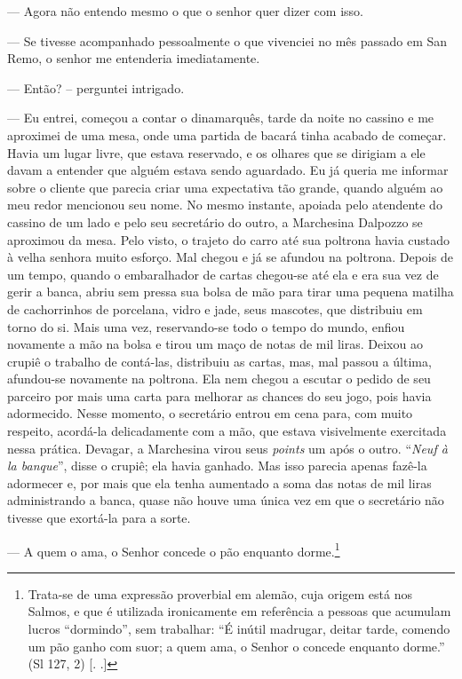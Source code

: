 --- Agora não entendo mesmo o que o senhor quer dizer com isso.

--- Se tivesse acompanhado pessoalmente o que vivenciei no mês passado em
San Remo, o senhor me entenderia imediatamente.

--- Então? -- perguntei intrigado.

--- Eu entrei, começou a contar o dinamarquês, tarde da noite no cassino e
me aproximei de uma mesa, onde uma partida de bacará tinha acabado de
começar. Havia um lugar livre, que estava reservado, e os olhares que se
dirigiam a ele davam a entender que alguém estava sendo aguardado. Eu já
queria me informar sobre o cliente que parecia criar uma expectativa tão
grande, quando alguém ao meu redor mencionou seu nome. No mesmo
instante, apoiada pelo atendente do cassino de um lado e pelo seu
secretário do outro, a Marchesina Dalpozzo se aproximou da mesa. Pelo
visto, o trajeto do carro até sua poltrona havia custado à velha senhora
muito esforço. Mal chegou e já se afundou na poltrona. Depois de um
tempo, quando o embaralhador de cartas chegou-se até ela e era sua vez
de gerir a banca, abriu sem pressa sua bolsa de mão para tirar uma
pequena matilha de cachorrinhos de porcelana, vidro e jade, seus
mascotes, que distribuiu em torno do si. Mais uma vez, reservando-se
todo o tempo do mundo, enfiou novamente a mão na bolsa e tirou um maço
de notas de mil liras. Deixou ao crupiê o trabalho de contá-las,
distribuiu as cartas, mas, mal passou a última, afundou-se novamente na
poltrona. Ela nem chegou a escutar o pedido de seu parceiro por mais uma
carta para melhorar as chances do seu jogo, pois havia adormecido. Nesse
momento, o secretário entrou em cena para, com muito respeito, acordá-la
delicadamente com a mão, que estava visivelmente exercitada nessa
prática. Devagar, a Marchesina virou seus \emph{points} um após o outro.
``\emph{Neuf à la banque}'', disse o crupiê; ela havia ganhado. Mas isso parecia apenas fazê-la adormecer e, por mais que ela tenha aumentado a soma das notas de mil liras administrando a banca, quase não houve uma única vez em que o secretário não tivesse que exortá-la para a sorte.

--- A quem o ama, o Senhor concede o pão enquanto dorme.\footnote{Trata-se
  de uma expressão proverbial em alemão, cuja origem está nos Salmos, e
  que é utilizada ironicamente em referência a pessoas que acumulam
  lucros ``dormindo'', sem trabalhar: ``É inútil madrugar, deitar tarde,
  comendo um pão ganho com suor; a quem ama, o Senhor o concede enquanto
  dorme.'' (Sl 127, 2) [. .]}

